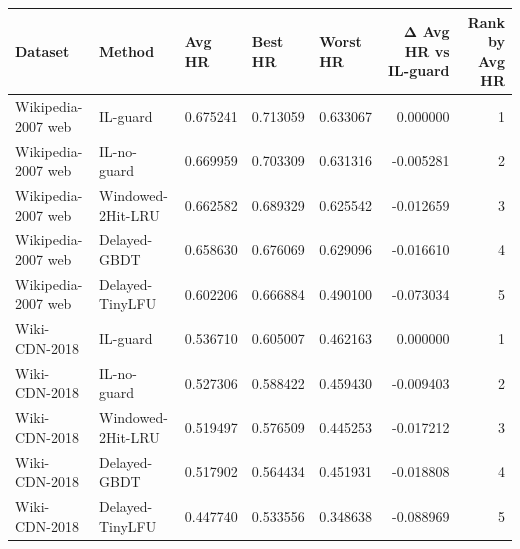 \begin{tabular}{lllllrr}
\toprule
Dataset & Method & Avg HR & Best HR & Worst HR & Δ Avg HR vs IL-guard & Rank by Avg HR \\
\midrule
Wikipedia-2007 web & IL-guard & 0.675241 & 0.713059 & 0.633067 & 0.000000 & 1 \\
Wikipedia-2007 web & IL-no-guard & 0.669959 & 0.703309 & 0.631316 & -0.005281 & 2 \\
Wikipedia-2007 web & Windowed-2Hit-LRU & 0.662582 & 0.689329 & 0.625542 & -0.012659 & 3 \\
Wikipedia-2007 web & Delayed-GBDT & 0.658630 & 0.676069 & 0.629096 & -0.016610 & 4 \\
Wikipedia-2007 web & Delayed-TinyLFU & 0.602206 & 0.666884 & 0.490100 & -0.073034 & 5 \\
Wiki-CDN-2018 & IL-guard & 0.536710 & 0.605007 & 0.462163 & 0.000000 & 1 \\
Wiki-CDN-2018 & IL-no-guard & 0.527306 & 0.588422 & 0.459430 & -0.009403 & 2 \\
Wiki-CDN-2018 & Windowed-2Hit-LRU & 0.519497 & 0.576509 & 0.445253 & -0.017212 & 3 \\
Wiki-CDN-2018 & Delayed-GBDT & 0.517902 & 0.564434 & 0.451931 & -0.018808 & 4 \\
Wiki-CDN-2018 & Delayed-TinyLFU & 0.447740 & 0.533556 & 0.348638 & -0.088969 & 5 \\
\bottomrule
\end{tabular}
